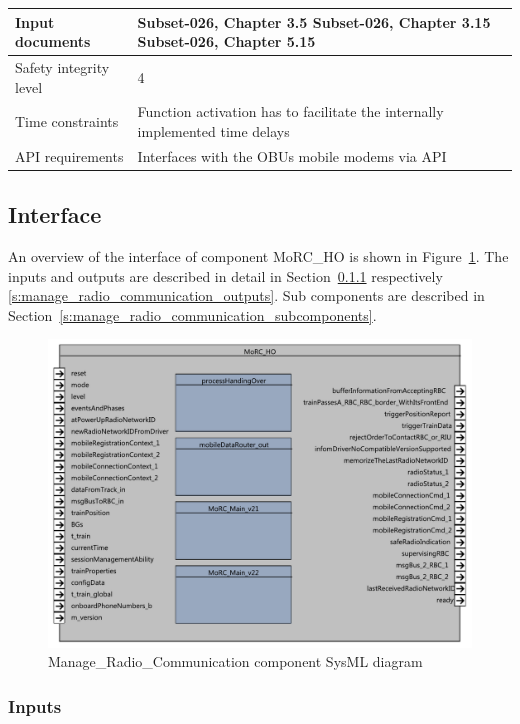 \begin{longtable}{p{}p{}}
\\
\midrule
Input documents	& 
Subset-026, Chapter 3.5 \newline
Subset-026, Chapter 3.15 \newline
Subset-026, Chapter 5.15 \\
\midrule
Safety integrity level	& 4 \\
\midrule
Time constraints		& Function activation has to facilitate the internally implemented time delays  \\
\midrule
API requirements 		& Interfaces with the OBUs mobile modems via API\\
\bottomrule
\end{longtable}


\subsection{Interface}

An overview of the interface of component MoRC\_HO is shown in Figure~\ref{f:manage_radio_communication_interface}. The inputs and outputs are described in detail in Section~\ref{s:manage_radio_communication_inputs} respectively \ref{s:manage_radio_communication_outputs}. Sub components are described in Section~\ref{s:manage_radio_communication_subcomponents}.

\begin{figure}[H]
\center
\includegraphics[width=0.9\linewidth]{images/F2_9_MoRC_HO.pdf}
\caption{Manage\_Radio\_Communication component SysML diagram}\label{f:manage_radio_communication_interface}
\end{figure}

\subsubsection{Inputs}\label{s:manage_radio_communication_inputs}

